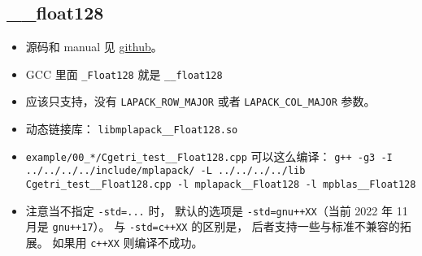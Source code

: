 
\begin{issues}
\issueDraft
\end{issues}


\subsection{\_\_float128}
\begin{itemize}
\item 源码和 manual 见 \href{https://github.com/nakatamaho/mplapack}{github}。
\item GCC 里面 \verb|_Float128| 就是 \verb|__float128|
\item 应该只支持，没有 \verb|LAPACK_ROW_MAJOR| 或者 \verb|LAPACK_COL_MAJOR| 参数。
\item 动态链接库： \verb|libmplapack__Float128.so|
\item \verb|example/00_*/Cgetri_test__Float128.cpp| 可以这么编译： \verb|g++ -g3 -I ../../../../include/mplapack/ -L ../../../../lib Cgetri_test__Float128.cpp -l mplapack__Float128 -l mpblas__Float128|
\item 注意当不指定 \verb|-std=...| 时， 默认的选项是 \verb|-std=gnu++XX|（当前 2022 年 11 月是 \verb|gnu++17|）。 与 \verb|-std=c++XX| 的区别是， 后者支持一些与标准不兼容的拓展。 如果用 \verb|c++XX| 则编译不成功。
\end{itemize}

